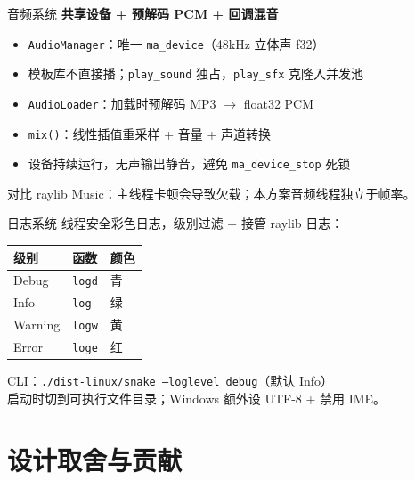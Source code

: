 \documentclass[aspectratio=169,13pt]{beamer}
\begin{document}
\begin{frame}{音频系统}
  \textbf{共享设备 + 预解码 PCM + 回调混音}

  \begin{itemize}
    \item \texttt{AudioManager}：唯一 \texttt{ma\_device}（48kHz 立体声 f32）
    \item 模板库不直接播；\texttt{play\_sound} 独占，\texttt{play\_sfx} 克隆入并发池
    \item \texttt{AudioLoader}：加载时预解码 MP3 $\rightarrow$ float32 PCM
    \item \texttt{mix()}：线性插值重采样 + 音量 + 声道转换
    \item 设备持续运行，无声输出静音，避免 \texttt{ma\_device\_stop} 死锁
  \end{itemize}

  \vspace{0.2em}
  对比 raylib Music：主线程卡顿会导致欠载；本方案音频线程独立于帧率。
\end{frame}

\begin{frame}{日志系统}
  线程安全彩色日志，级别过滤 + 接管 raylib 日志：

  \begin{table}
    \centering
    \footnotesize
    \begin{tabular}{@{}lll@{}}
      \toprule
      级别 & 函数 & 颜色 \\
      \midrule
      Debug & \texttt{logd} & 青 \\
      Info & \texttt{log} & 绿 \\
      Warning & \texttt{logw} & 黄 \\
      Error & \texttt{loge} & 红 \\
      \bottomrule
    \end{tabular}
  \end{table}

  \vspace{0.3em}
  CLI：\texttt{./dist-linux/snake --loglevel debug}（默认 Info）\\
  启动时切到可执行文件目录；Windows 额外设 UTF-8 + 禁用 IME。
\end{frame}

\section{设计取舍与贡献}
\end{document}
